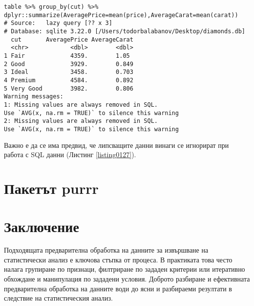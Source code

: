 \begin{lstlisting}[caption=Пресмятания с данни в база данни, label=listing0127]
table %>% group_by(cut) %>% dplyr::summarize(AveragePrice=mean(price),AverageCarat=mean(carat))
# Source:   lazy query [?? x 3]
# Database: sqlite 3.22.0 [/Users/todorbalabanov/Desktop/diamonds.db]
  cut       AveragePrice AverageCarat
  <chr>            <dbl>        <dbl>
1 Fair             4359.        1.05 
2 Good             3929.        0.849
3 Ideal            3458.        0.703
4 Premium          4584.        0.892
5 Very Good        3982.        0.806
Warning messages:
1: Missing values are always removed in SQL.
Use `AVG(x, na.rm = TRUE)` to silence this warning 
2: Missing values are always removed in SQL.
Use `AVG(x, na.rm = TRUE)` to silence this warning
\end{lstlisting}

Важно е да се има предвид, че липсващите данни винаги се игнорират при работа с SQL данни (Листинг \ref{listing0127}).

\section{Пакетът purrr}

\section*{Заключение}

Подходящата предварителна обработка на данните за извършване на статистически анализ е ключова стъпка от процеса. В практиката това често налага групиране по признаци, филтриране по зададен критерии или итеративно обхождане и манипулация по зададени условия. Доброто разбиране и ефективната предварителна обработка на данните води до ясни и разбираеми резултати в следствие на статистическия анализ. 

